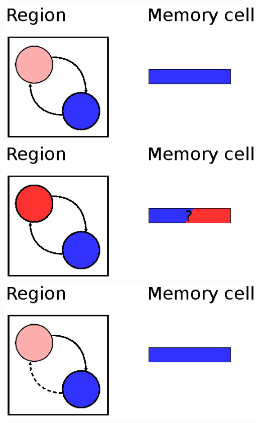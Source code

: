 \documentclass{beamer}
\begin{document}
\begin{frame}
\begin{overprint}
    \includegraphics[trim=5px 5px 5px 5px]{region5.eps}
    \includegraphics[trim=5px 5px 5px 5px]{region6.eps}
    \includegraphics[trim=5px 5px 5px 5px]{region7.eps}
  \end{overprint}
\end{frame}
\end{document}
